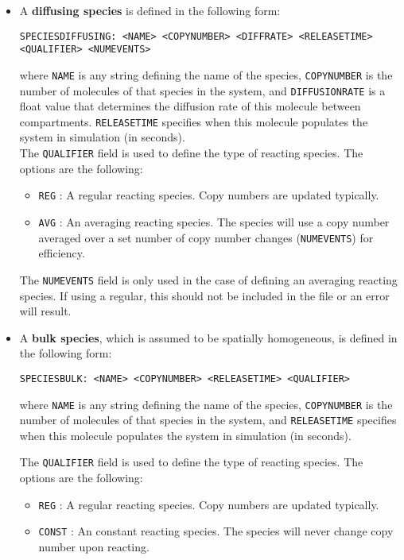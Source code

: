 \documentclass[11pt, oneside]{article}   	%
\begin{document}
\begin{itemize}
\item 
A \textbf{diffusing species} is defined in the following form:\newline\newline \centerline{\texttt{SPECIESDIFFUSING: <NAME> <COPYNUMBER> <DIFFRATE> <RELEASETIME> <QUALIFIER> <NUMEVENTS>}}\newline\newline where \texttt{NAME} is any string defining the name of the species, \texttt{COPYNUMBER} is the number of molecules of that species in the system, and \texttt{DIFFUSIONRATE} is a float value that determines the diffusion rate of this molecule between compartments. \texttt{RELEASETIME} specifies when this molecule populates the system in simulation (in seconds).\\

The \texttt{QUALIFIER} field is used to define the type of reacting species. The options are the following:
\begin{itemize}
\item \texttt{REG} : A regular reacting species. Copy numbers are updated typically.
\item \texttt{AVG} : An averaging reacting species. The species will use a copy number averaged over a set number of copy number changes (\texttt{NUMEVENTS}) for efficiency.
\end{itemize}
The \texttt{NUMEVENTS} field is only used in the case of defining an averaging reacting species. If using a regular, this should  not be included in the file or an error will result.

\item
A \textbf{bulk species}, which is assumed to be spatially homogeneous, is defined in the following form:\newline\newline\centerline{\texttt{SPECIESBULK: <NAME> <COPYNUMBER> <RELEASETIME> <QUALIFIER>}}\newline\newline where \texttt{NAME} is any string defining the name of the species, \texttt{COPYNUMBER} is the number of molecules of that species in the system, and \texttt{RELEASETIME} specifies when this molecule populates the system in simulation (in seconds).

The \texttt{QUALIFIER} field is used to define the type of reacting species. The options are the following:
\begin{itemize}
\item \texttt{REG} : A regular reacting species. Copy numbers are updated typically.
\item \texttt{CONST} : An constant reacting species. The species will never change copy number upon reacting.
\end{itemize}


\end{itemize}
\end{document}
